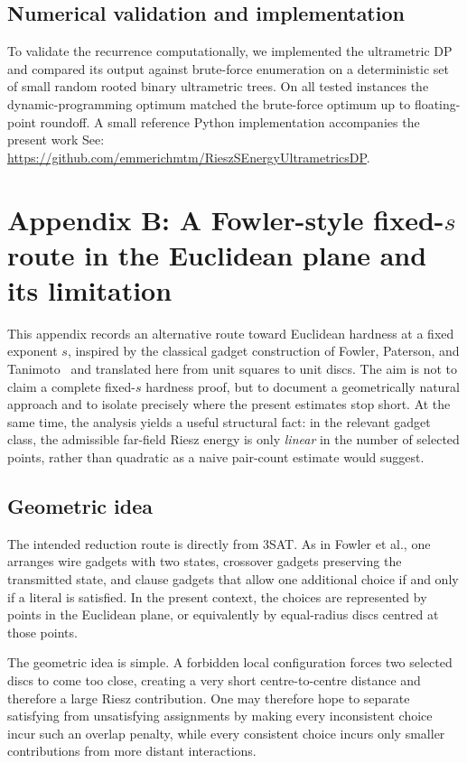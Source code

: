 \documentclass[11pt]{article}
\begin{document}
\subsection{Numerical validation and implementation}

To validate the recurrence computationally, we implemented the ultrametric DP and compared its output against brute-force enumeration on a deterministic set of small random rooted binary ultrametric trees. On all tested instances the dynamic-programming optimum matched the brute-force optimum up to floating-point roundoff. A small reference Python implementation accompanies the present work See: \url{https://github.com/emmerichmtm/RieszSEnergyUltrametricsDP}.


\section{Appendix B: A Fowler-style fixed-\texorpdfstring{$s$}{s} route in the Euclidean plane and its limitation}
\label{app:fowler}

This appendix records an alternative route toward Euclidean hardness at a fixed exponent $s$, inspired by the classical gadget construction of Fowler, Paterson, and Tanimoto~\cite{FowlerPatersonTanimoto1981} and translated here from unit squares to unit discs. The aim is not to claim a complete fixed-$s$ hardness proof, but to document a geometrically natural approach and to isolate precisely where the present estimates stop short. At the same time, the analysis yields a useful structural fact: in the relevant gadget class, the admissible far-field Riesz energy is only \emph{linear} in the number of selected points, rather than quadratic as a naive pair-count estimate would suggest.

\subsection{Geometric idea}

The intended reduction route is directly from \textsc{3SAT}. As in Fowler et al., one arranges wire gadgets with two states, crossover gadgets preserving the transmitted state, and clause gadgets that allow one additional choice if and only if a literal is satisfied. In the present context, the choices are represented by points in the Euclidean plane, or equivalently by equal-radius discs centred at those points.

The geometric idea is simple. A forbidden local configuration forces two selected discs to come too close, creating a very short centre-to-centre distance and therefore a large Riesz contribution. One may therefore hope to separate satisfying from unsatisfying assignments by making every inconsistent choice incur such an overlap penalty, while every consistent choice incurs only smaller contributions from more distant interactions.
\end{document}

